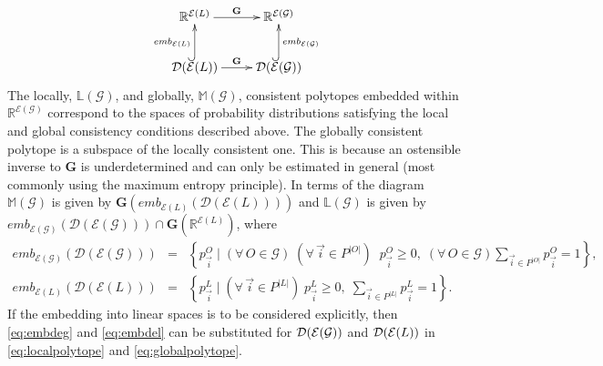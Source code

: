 \begin{equation*}
\xymatrix{
 \mathbb{R}^{\mathcal{E}(L)} \ar[r]^{\mathbf{G}} &
   \mathbb{R}^{\mathcal{E}(\mathcal{G})} \\
 \dist (\mathcal{E}(L)) \ar[r]^{\mathbf{G}} \ar@{^{(}->}[u]^{emb_{\mathcal{E}(L)}}& \ar@{^{(}->}[u]_{emb_{\mathcal{E}(\mathcal{G})}}
  \dist (\mathcal{E}(\mathcal{G}))
  }
\end{equation*}
The locally, $\mathbb{L}(\mathcal{G})$, and globally, $\mathbb{M}(\mathcal{G})$, consistent polytopes embedded within $\mathbb{R}^{\mathcal{E}(\mathcal{G})}$ correspond to the spaces of probability distributions satisfying the local and global consistency conditions described above. The globally consistent polytope is a subspace of the locally consistent one. This is because an ostensible inverse to $\mathbf{G}$ is underdetermined and can only be estimated in general (most commonly using the maximum entropy principle). In terms of the diagram $\mathbb{M}(\mathcal{G})$ is given by $\mathbf{G}(emb_{\mathcal{E}(L)}(\mathcal{D}(\mathcal{E}(L))))$ and $\mathbb{L}(\mathcal{G})$ is given by $emb_{\mathcal{E}(\mathcal{G})}(\mathcal{D}(\mathcal{E}(\mathcal{G}))) \cap \mathbf{G}(\mathbb{R}^{\mathcal{E}(L)})$, where
\begin{eqnarray}
emb_{\mathcal{E}(\mathcal{G})}(\mathcal{D}(\mathcal{E}(\mathcal{G}))) &=& \left\{ p^{O}_{\vec{i}} \; \bigg| \; (\forall\, O \in \mathcal{G}) \; (\forall\, \vec{i} \in P^{|O|}) \;\; p^O_{\vec{i}} \geq 0, \; (\forall\, O \in \mathcal{G}) \sum_{\vec{i} \in P^{|O|}} p^{O}_{\vec{i}} = 1 \right\}, \label{eq:embdeg}\\
emb_{\mathcal{E}(L)}(\mathcal{D}(\mathcal{E}(L))) &=& \left\{ p^L_{\vec{i}} \; \bigg| \; (\forall\, \vec{i} \in P^{|L|}) \; p^L_{\vec{i}} \geq 0, \; \sum_{\vec{i} \in P^{|L|}} p^L_{\vec{i}} = 1 \right\}. \label{eq:embdel}
\end{eqnarray}
If the embedding into linear spaces is to be considered explicitly, then \ref{eq:embdeg} and \ref{eq:embdel} can be substituted for $\mathcal{D}{}(\mathcal{E}{}(\mathcal{G}))$ and $\mathcal{D}{}(\mathcal{E}{}(L))$ in \ref{eq:localpolytope} and \ref{eq:globalpolytope}.
